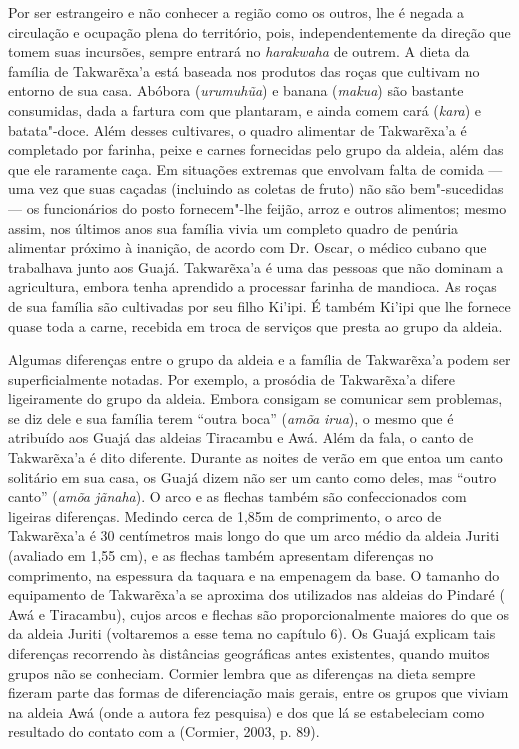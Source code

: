 Por ser estrangeiro e não conhecer a região como os outros, lhe é negada
a circulação e ocupação plena do território, pois, independentemente da
direção que tomem suas incursões, sempre entrará no \emph{harakwaha} de
outrem. A dieta da família de Takwarẽxa'a está baseada nos produtos das
roças que cultivam no entorno de sua casa. Abóbora (\emph{urumuhũa}) e
banana (\emph{makua}) são bastante consumidas, dada a fartura com que
plantaram, e ainda comem cará (\emph{kara}) e batata"-doce. Além desses
cultivares, o quadro alimentar de Takwarẽxa'a é completado por farinha,
peixe e carnes fornecidas pelo grupo da aldeia, além das que ele
raramente caça. Em situações extremas que envolvam falta de comida --- uma
vez que suas caçadas (incluindo as coletas de fruto) não são
bem"-sucedidas --- os funcionários do posto fornecem"-lhe feijão, arroz e
outros alimentos; mesmo assim, nos últimos anos sua família vivia um
completo quadro de penúria alimentar próximo à inanição, de acordo com
Dr. Oscar, o médico cubano que trabalhava junto aos Guajá. Takwarẽxa'a é
uma das pessoas que não dominam a agricultura, embora tenha aprendido a
processar farinha de mandioca. As roças de sua família são cultivadas
por seu filho Ki'ipi. É também Ki'ipi que lhe fornece quase toda a
carne, recebida em troca de serviços que presta ao grupo da aldeia.

Algumas diferenças entre o grupo da aldeia e a família de Takwarẽxa'a
podem ser superficialmente notadas. Por exemplo, a prosódia de
Takwarẽxa'a difere ligeiramente do grupo da aldeia. Embora consigam se
comunicar sem problemas, se diz dele e sua família terem ``outra boca''
(\emph{amõa} \emph{irua}), o mesmo que é atribuído aos Guajá das aldeias
Tiracambu e Awá. Além da fala, o canto de Takwarẽxa'a é dito diferente.
Durante as noites de verão em que entoa um canto solitário em sua casa,
os Guajá dizem não ser um canto como deles, mas ``outro canto''
(\emph{amõa jãnaha}). O arco e as flechas também são confeccionados com
ligeiras diferenças. Medindo cerca de 1,85m de comprimento, o arco de
Takwarẽxa'a é 30 centímetros mais longo do que um arco médio da aldeia
Juriti (avaliado em 1,55 cm), e as flechas também apresentam diferenças
no comprimento, na espessura da taquara e na empenagem da base. O
tamanho do equipamento de Takwarẽxa'a se aproxima dos utilizados nas
aldeias do Pindaré ( Awá e  Tiracambu), cujos arcos e flechas são
proporcionalmente maiores do que os da aldeia Juriti (voltaremos a esse
tema no capítulo 6). Os Guajá explicam tais diferenças recorrendo às
distâncias geográficas antes existentes, quando muitos grupos não se
conheciam. Cormier lembra que as diferenças na dieta sempre fizeram
parte das formas de diferenciação mais gerais, entre os grupos que
viviam na aldeia Awá (onde a autora fez pesquisa) e dos que lá se
estabeleciam como resultado do contato com a  (Cormier, 2003, p.
89).

